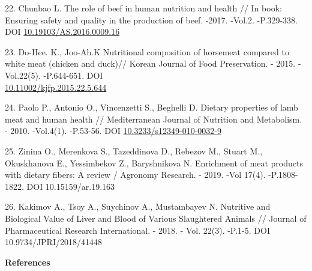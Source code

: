 \begin{references}
22. Chunbao L. The role of beef in human nutrition and health // In book:
Ensuring safety and quality in the production of beef. -2017. -Vol.2.
-P.329-338.
DOI \href{http://dx.doi.org/10.19103/AS.2016.0009.16}{10.19103/AS.2016.0009.16}

23. Do-Hee. K., Joo-Ah.K Nutritional composition of horsemeat compared to
white meat (chicken and duck)// Korean Journal of Food Preservation. -
2015. -Vol.22(5). -P.644-651. DOI\\
\href{http://dx.doi.org/10.11002/kjfp.2015.22.5.644}{10.11002/kjfp.2015.22.5.644}

24. Paolo P., Antonio O., Vincenzetti S., Beghelli D. Dietary properties
of lamb meat and human health // Mediterranean Journal of Nutrition
and Metabolism. - 2010. -Vol.4(1). -P.53-56. DOI
\href{https://doi.org/10.3233/s12349-010-0032-9}{10.3233/s12349-010-0032-9}

25. Zinina O., Merenkova S., Tazeddinova D., Rebezov M., Stuart M.,
Okuskhanova E., Yessimbekov Z., Baryshnikova N. Enrichment of meat
products with dietary fibers: A review / Agronomy Research. - 2019.
-Vol 17(4). -P.1808-1822. DOI 10.15159/ar.19.163

26. Kakimov A., Tsoy A., Suychinov A., Mustambayev N. Nutritive and
Biological Value of Liver and Blood of Various Slaughtered Animals //
Journal of Pharmaceutical Research International. - 2018. - Vol.
22(3). -P.1-5. DOI 10.9734/JPRI/2018/41448
\end{references}

\begin{center}
{\bfseries References}
\end{center}


